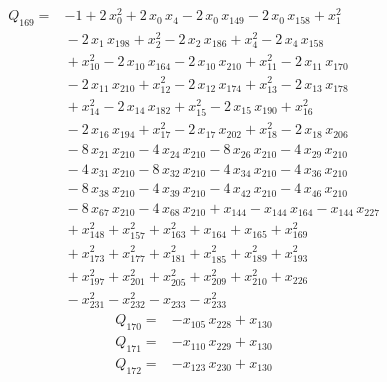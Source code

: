 \documentclass[11pt]{article}
\theoremstyle{definition}\newtheorem{definition}[theorem]{Definition}
\begin{document}
\begin{align*}
Q_{169}={}&-1+2\,x_{0}^{2}+2\,x_{0}\,x_{4}-2\,x_{0}\,x_{149}-2\,x_{0}\,x_{158}+x_{1}^{2}
\\ &{}-2\,x_{1}\,x_{198}+x_{2}^{2}-2\,x_{2}\,x_{186}+x_{4}^{2}-2\,x_{4}\,x_{158}
\\ &{}+x_{10}^{2}-2\,x_{10}\,x_{164}-2\,x_{10}\,x_{210}+x_{11}^{2}-2\,x_{11}\,x_{170}
\\ &{}-2\,x_{11}\,x_{210}+x_{12}^{2}-2\,x_{12}\,x_{174}+x_{13}^{2}-2\,x_{13}\,x_{178}
\\ &{}+x_{14}^{2}-2\,x_{14}\,x_{182}+x_{15}^{2}-2\,x_{15}\,x_{190}+x_{16}^{2}
\\ &{}-2\,x_{16}\,x_{194}+x_{17}^{2}-2\,x_{17}\,x_{202}+x_{18}^{2}-2\,x_{18}\,x_{206}
\\ &{}-8\,x_{21}\,x_{210}-4\,x_{24}\,x_{210}-8\,x_{26}\,x_{210}-4\,x_{29}\,x_{210}
\\ &{}-4\,x_{31}\,x_{210}-8\,x_{32}\,x_{210}-4\,x_{34}\,x_{210}-4\,x_{36}\,x_{210}
\\ &{}-8\,x_{38}\,x_{210}-4\,x_{39}\,x_{210}-4\,x_{42}\,x_{210}-4\,x_{46}\,x_{210}
\\ &{}-8\,x_{67}\,x_{210}-4\,x_{68}\,x_{210}+x_{144}-x_{144}\,x_{164}-x_{144}\,x_{227}
\\ &{}+x_{148}^{2}+x_{157}^{2}+x_{163}^{2}+x_{164}+x_{165}+x_{169}^{2}
\\ &{}+x_{173}^{2}+x_{177}^{2}+x_{181}^{2}+x_{185}^{2}+x_{189}^{2}+x_{193}^{2}
\\ &{}+x_{197}^{2}+x_{201}^{2}+x_{205}^{2}+x_{209}^{2}+x_{210}^{2}+x_{226}
\\ &{}-x_{231}^{2}-x_{232}^{2}-x_{233}-x_{233}^{2}
\end{align*}
\begin{align*}
Q_{170}={}&-x_{105}\,x_{228}+x_{130}
\end{align*}
\begin{align*}
Q_{171}={}&-x_{110}\,x_{229}+x_{130}
\end{align*}
\begin{align*}
Q_{172}={}&-x_{123}\,x_{230}+x_{130}
\end{align*}
\end{document}
